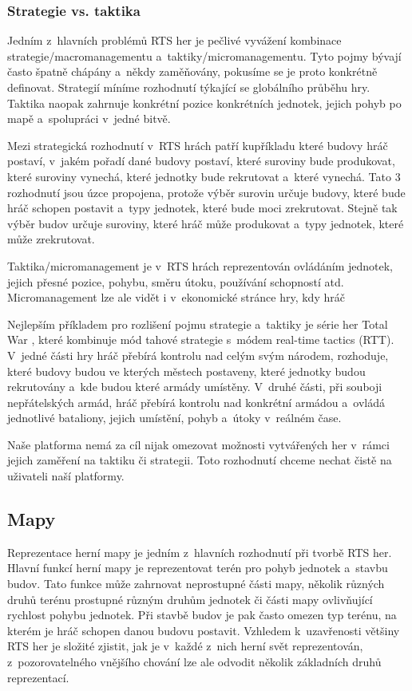\subsubsection*{Strategie vs. taktika}
Jedním z~hlavních problémů RTS her je pečlivé vyvážení kombinace strategie/macromanagementu a~taktiky/micromanagementu. Tyto pojmy bývají často špatně chápány a~někdy zaměňovány, pokusíme se je proto konkrétně definovat. Strategií míníme  rozhodnutí týkající se globálního průběhu hry. Taktika  naopak zahrnuje konkrétní pozice konkrétních jednotek, jejich pohyb po mapě a~spolupráci v~jedné bitvě. 

Mezi strategická rozhodnutí v~RTS hrách patří kupříkladu které budovy hráč postaví, v~jakém pořadí dané budovy postaví, které suroviny bude produkovat, které suroviny vynechá, které jednotky bude rekrutovat a~které vynechá.  Tato 3 rozhodnutí jsou úzce propojena, protože výběr surovin určuje budovy, které bude hráč schopen postavit a~typy jednotek, které bude moci zrekrutovat. Stejně tak výběr budov určuje suroviny, které hráč může produkovat a~typy jednotek, které může zrekrutovat. 

Taktika/micromanagement je v~RTS hrách reprezentován ovládáním jednotek, jejich přesné pozice, pohybu, směru útoku, používání schopností atd. Micromanagement lze ale vidět i v~ekonomické stránce hry, kdy hráč 

Nejlepším příkladem pro rozlišení pojmu strategie a~taktiky je série her Total War \citep{site:totalwar}, které kombinuje mód tahové strategie s~módem real-time tactics (RTT). V~jedné části hry hráč přebírá kontrolu nad celým svým národem, rozhoduje, které budovy budou ve kterých městech postaveny, které jednotky budou rekrutovány a~kde budou které armády umístěny. V~druhé části, při souboji nepřátelských armád, hráč přebírá kontrolu nad konkrétní armádou a~ovládá jednotlivé bataliony, jejich umístění, pohyb a~útoky v~reálném čase.

Naše platforma nemá za cíl nijak omezovat možnosti vytvářených her v~rámci jejich zaměření na taktiku či strategii. Toto rozhodnutí chceme nechat čistě na uživateli naší platformy.

\subsection{Mapy}
\label{sec:mapy}
Reprezentace herní mapy je jedním z~hlavních rozhodnutí při tvorbě RTS her. Hlavní funkcí herní mapy je reprezentovat terén pro pohyb jednotek a~stavbu budov. 
Tato funkce může zahrnovat neprostupné části mapy, několik různých druhů terénu prostupné různým druhům jednotek či části mapy ovlivňující rychlost pohybu jednotek.
Při stavbě budov je pak často omezen typ terénu, na kterém je hráč schopen danou budovu postavit. 
Vzhledem k~uzavřenosti většiny RTS her je složité zjistit, jak je v~každé z~nich herní svět reprezentován, z~pozorovatelného vnějšího chování lze ale odvodit několik základních druhů reprezentací. 

